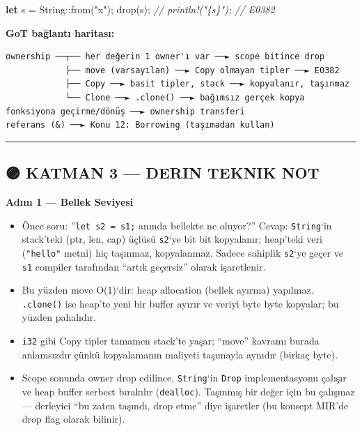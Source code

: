 \documentclass[12pt,a4paper]{article}
\newenvironment{Shaded}{}{}
\newcommand{\CommentTok}[1]{\textcolor[rgb]{0.38,0.63,0.69}{\textit{#1}}}
\newcommand{\DataTypeTok}[1]{\textcolor[rgb]{0.56,0.13,0.00}{#1}}
\newcommand{\FunctionTok}[1]{\textcolor[rgb]{0.02,0.16,0.49}{#1}}
\newcommand{\KeywordTok}[1]{\textcolor[rgb]{0.00,0.44,0.13}{\textbf{#1}}}
\newcommand{\NormalTok}[1]{#1}
\newcommand{\OperatorTok}[1]{\textcolor[rgb]{0.40,0.40,0.40}{#1}}
\newcommand{\StringTok}[1]{\textcolor[rgb]{0.25,0.44,0.63}{#1}}
\begin{document}
\begin{itemize}
\begin{Shaded}
\begin{Highlighting}[]
\KeywordTok{let}\NormalTok{ s }\OperatorTok{=} \DataTypeTok{String}\OperatorTok{::}\FunctionTok{from}\OperatorTok{(}\StringTok{"x"}\OperatorTok{);}
\FunctionTok{drop}\OperatorTok{(}\NormalTok{s}\OperatorTok{);}
\CommentTok{// println!("\{s\}");   // E0382}
\end{Highlighting}
\end{Shaded}
\end{itemize}

\textbf{GoT bağlantı haritası:}

\begin{verbatim}
ownership ──┬── her değerin 1 owner'ı var ──► scope bitince drop
            ├── move (varsayılan) ──► Copy olmayan tipler ──► E0382
            ├── Copy ──► basit tipler, stack ──► kopyalanır, taşınmaz
            └── Clone ──► .clone() ──► bağımsız gerçek kopya
fonksiyona geçirme/dönüş ──► ownership transferi
referans (&) ──► Konu 12: Borrowing (taşımadan kullan)
\end{verbatim}

\begin{center}\rule{0.5\linewidth}{0.5pt}\end{center}

\subsection{🟣 KATMAN 3 --- DERIN TEKNIK NOT}\label{katman-3-—-derin-teknik-not-10}

\textbf{Adım 1 --- Bellek Seviyesi}

\begin{itemize}
\tightlist
\item
  Önce soru: ''\texttt{let\ s2\ =\ s1;} anında bellekte ne oluyor?'' Cevap: \texttt{String}`in stack'teki (ptr, len, cap) üçlüsü \texttt{s2}`ye bit bit kopyalanır; heap'teki veri (\texttt{"hello"} metni) hiç taşınmaz, kopyalanmaz. Sadece sahiplik \texttt{s2}`ye geçer ve \texttt{s1} compiler tarafından ``artık geçersiz'' olarak işaretlenir.
\item
  Bu yüzden move O(1)`dir: heap allocation (bellek ayırma) yapılmaz. \texttt{.clone()} ise heap'te yeni bir buffer ayırır ve veriyi byte byte kopyalar; bu yüzden pahalıdır.
\item
  \texttt{i32} gibi Copy tipler tamamen stack'te yaşar; ``move'' kavramı burada anlamsızdır çünkü kopyalamanın maliyeti taşımayla aynıdır (birkaç byte).
\item
  Scope sonunda owner drop edilince, \texttt{String}`in \texttt{Drop} implementasyonu çalışır ve heap buffer serbest bırakılır (\texttt{dealloc}). Taşınmış bir değer için bu çalışmaz --- derleyici ``bu zaten taşındı, drop etme'' diye işaretler (bu konsept MIR'de drop flag olarak bilinir).
\end{itemize}
\end{document}
